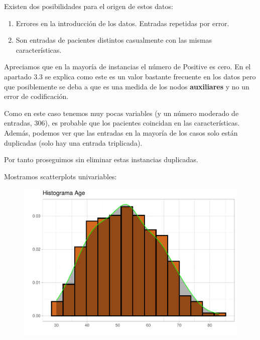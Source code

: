\vspace{\baselineskip}

Existen dos posibilidades para el origen de estos datos:

\begin{enumerate}
    \def\labelenumi{\arabic{enumi}.}
    \item Errores en la introducción de los datos. Entradas repetidas por error.
    \item Son entradas de pacientes distintos casualmente con las mismas características.
\end{enumerate}

Apreciamos que en la mayoría de instancias el número de Positive es cero. En el apartado 3.3 se explica como este es un valor bastante frecuente en los datos pero que posiblemente se deba a que es una medida de los nodos \textbf{auxiliares} y no un error de codificación.

\vspace{\baselineskip}

Como en este caso tenemos muy pocas variables (y un número moderado de entradas, 306), es probable que los pacientes coincidan en las características. Además, podemos ver que las entradas en la mayoría de los casos solo están duplicadas (solo hay una entrada triplicada).

\vspace{\baselineskip}

Por tanto proseguimos sin eliminar estas instancias duplicadas.

\newpage
Mostramos scatterplots univariables:

\begin{figure}[H]\includegraphics[width=.9\linewidth]{img/EDA2_files/figure-latex/unnamed-chunk-10-1} \caption{}\end{figure}

